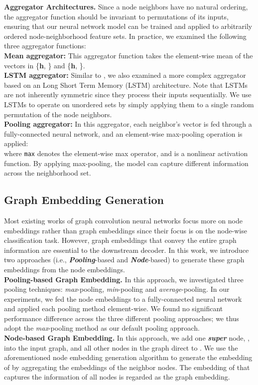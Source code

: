 \documentclass{article} \usepackage{iclr2019_conference,times}
\begin{document}
\textbf{Aggregator Architectures.}
Since a node neighbors have no natural ordering, the aggregator function should
be invariant to permutations of its inputs,  ensuring that our neural network model can
be trained and applied to arbitrarily ordered node-neighborhood feature sets.
In practice, we examined the following three aggregator functions:\\
\textbf{Mean aggregator:} This aggregator function takes the element-wise mean of the vectors in
    \{\textbf{h}, \} and \{\textbf{h}, \}.\\
\textbf{LSTM aggregator:} Similar to \citep{hamilton2017inductive}, we also examined a more complex aggregator based on an Long Short Term Memory (LSTM) architecture. Note that LSTMs are not inherently symmetric since they process their inputs sequentially. We  use LSTMs to operate on unordered sets by simply applying them to a single random permutation of the node neighbors.\\
\textbf{Pooling aggregator:} In this aggregator, each neighbor's vector is fed through a fully-connected neural network, and an element-wise max-pooling operation is applied:\\
    
    where \texttt{max} denotes the element-wise max operator, and  is a nonlinear activation function.
    By applying max-pooling, the model can capture different information across the neighborhood set.


\subsection{Graph Embedding Generation}
Most existing works of graph convolution neural networks focus more on node embeddings rather than graph embeddings since their focus is on the node-wise classification task.
However, graph embeddings that convey the entire graph information are essential to the downstream decoder.
In this work, we introduce two approaches (i.e., \textit{\textbf{Pooling}}-based and \textit{\textbf{Node}}-based) to generate these graph embeddings from the node embeddings. \\
\textbf{Pooling-based Graph Embedding.}
In this approach, we investigated three pooling techniques: \textit{max}-pooling, \textit{min}-pooling and \textit{average}-pooling. In our experiments, we fed the node embeddings to a fully-connected neural network and applied each pooling method element-wise.
We found no significant performance difference across the three different pooling approaches; we thus adopt the \textit{max}-pooling method as our default pooling approach. \\
\textbf{Node-based Graph Embedding.}
In this approach, we add one \textbf{\textit{super}} node, , into the input graph,
and all other nodes in the graph direct to .
We use the aforementioned node embedding generation algorithm to generate the embedding of  by aggregating the embeddings of the neighbor nodes.
The embedding of  that captures the information of all nodes is regarded as the graph embedding.
\end{document}

